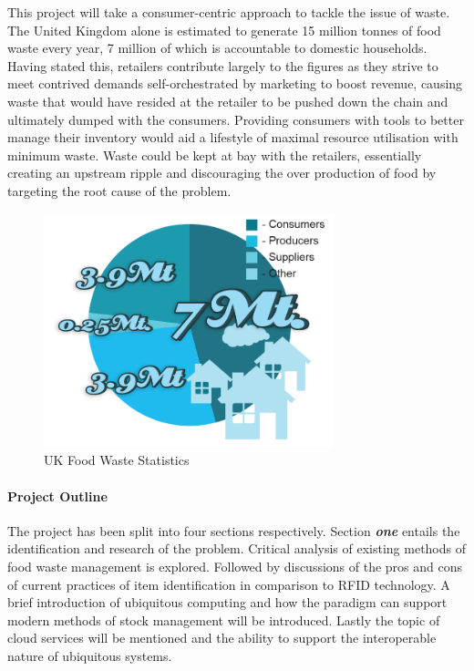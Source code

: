 \documentclass[a4paper, 11pt]{article}
\begin{document}
This project will take a consumer-centric approach to tackle the issue of waste. The United Kingdom alone is estimated to generate 15 million tonnes of food waste every year, 7 million of which is accountable to domestic households.\cite{statistic} Having stated this, retailers contribute largely to the figures as they strive to meet contrived demands self-orchestrated by marketing to boost revenue, causing waste that would have resided at the retailer to be pushed down the chain and ultimately dumped with the consumers.\cite{waste} Providing consumers with tools to better manage their inventory would aid a lifestyle of maximal resource utilisation with minimum waste. Waste could be kept at bay with the retailers, essentially creating an upstream ripple and discouraging the over production of food by targeting the root cause of the problem.\vspace{\baselineskip}

\begin{figure}[h!]
  \centering
    \includegraphics[width=0.75\textwidth]{system7.png}
      \caption{UK Food Waste Statistics}
\end{figure}

\vspace{\baselineskip}

\paragraph{Project Outline}
The project has been split into four sections respectively. Section \textbf{\emph{one}} entails the identification and research of the problem. Critical analysis of existing methods of food waste management is explored. Followed by discussions of the pros and cons of current practices of item identification in comparison to RFID technology. A brief introduction of ubiquitous computing and how the paradigm can support modern methods of stock management will be introduced. Lastly the topic of cloud services will be mentioned and the ability to support the interoperable nature of ubiquitous systems.
\end{document}
